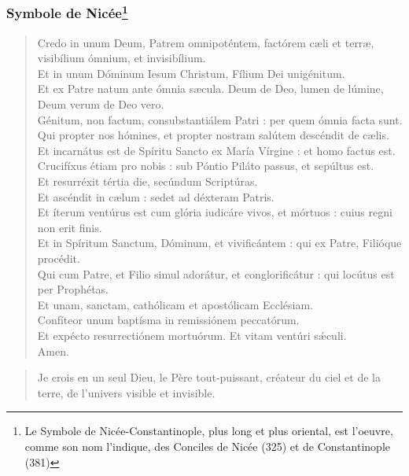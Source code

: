 \subsubsection*{Symbole de Nicée\footnote{Le Symbole de Nicée-Constantinople, 
plus long et plus oriental, est l’oeuvre, comme son nom l’indique, des Conciles 
de Nicée (325) et de Constantinople (381)}}

{\bf
\begin{minipage}[t]{0.5\textwidth}
\begin{verse}
 Credo in unum Deum, Patrem omnipoténtem, fact\'orem cæli et terræ, visibílium \'omnium, et invisibílium. \\
 Et in unum D\'ominum Iesum Christum, Fílium Dei unigénitum. \\
 Et ex Patre natum ante \'omnia sæcula. Deum de Deo, lumen de lúmine, Deum verum de Deo vero. \\
 Génitum, non factum, consubstantiálem Patri : per quem \'omnia facta sunt. \\
 Qui propter nos h\'omines, et propter nostram salútem descéndit de cælis. \\
 Et incarnátus est de Spíritu Sancto ex María Vírgine : et homo factus est. \\
 Crucifíxus étiam pro nobis : sub P\'ontio Piláto passus, et sepúltus est. \\
 Et resurréxit tértia die, secúndum Scriptúras. \\
 Et ascéndit in cælum : sedet ad déxteram Patris. \\
 Et íterum ventúrus est cum gl\'oria iudicáre vivos, et m\'ortuos : cuius regni non erit finis. \\
 Et in Spíritum Sanctum, D\'ominum, et vivificántem : qui ex Patre, Fili\'oque procédit. \\
 Qui cum Patre, et Filio simul adorátur, et conglorificátur : qui locútus est per Prophétas. \\
 Et unam, sanctam, cath\'olicam et apost\'olicam Ecclésiam. \\
 Confíteor unum baptísma in remissi\'onem peccat\'orum. \\
 Et expécto resurrecti\'onem mortu\'orum. Et vitam ventúri s\'\ae{}culi.\\
 Amen.
\end{verse}
\end{minipage}
\begin{minipage}[t]{0.5\textwidth}
\begin{verse}
 Je crois en un seul Dieu, le Père tout-puissant, créateur du ciel et de la terre, de l'univers visible et invisible. \\

\end{verse}
\end{minipage}}
